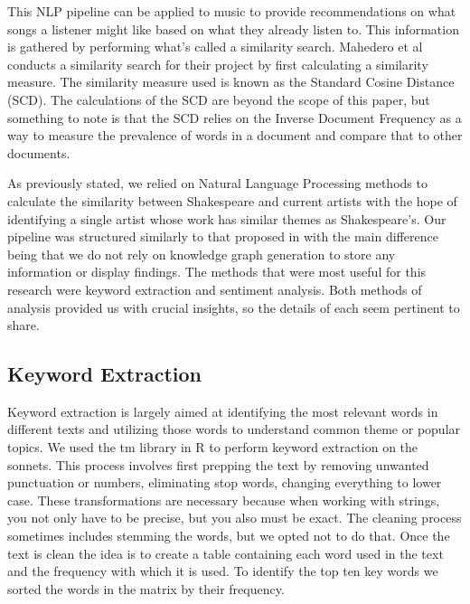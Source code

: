 \documentclass[10pt,a4paper]{article}
\begin{document}
\noindent This NLP pipeline can be applied to music to provide recommendations on what songs a listener might like based on what they already listen to. \cite{NLP-for-lyrics} This information is gathered by performing what’s called a similarity search. Mahedero et al \cite{NLP-for-lyrics} conducts a similarity search for their project by first calculating a similarity measure. The similarity measure used is known as the Standard Cosine Distance (SCD). The calculations of the SCD are beyond the scope of this paper, but something to note is that the SCD relies on the Inverse Document Frequency as a way to measure the prevalence of words in a document and compare that to other documents. 

\noindent As previously stated, we relied on Natural Language Processing methods to calculate the similarity between Shakespeare and current artists with the hope of identifying a single artist whose work has similar themes as Shakespeare’s. Our pipeline was structured similarly to that proposed in \cite{NLP-for-music} with the main difference being that we do not rely on knowledge graph generation to store any information or display findings. The methods that were most useful for this research were keyword extraction and sentiment analysis. Both methods of analysis provided us with crucial insights, so the details of each seem pertinent to share. 

\subsection{Keyword Extraction}
Keyword extraction is largely aimed at identifying the most relevant words in different texts and utilizing those words to understand common theme or popular topics.\cite{monkey} We used the tm library in R to perform keyword extraction\cite{tm} on the sonnets. This process involves first prepping the text by removing unwanted punctuation or numbers, eliminating stop words, changing everything to lower case. These transformations are necessary because when working with strings, you not only have to be precise, but you also must be exact. The cleaning process sometimes includes stemming the words, but we opted not to do that. Once the text is clean the idea is to create a table containing each word used in the text and the frequency with which it is used. To identify the top ten key words we sorted the words in the matrix by their frequency. 
\end{document}
